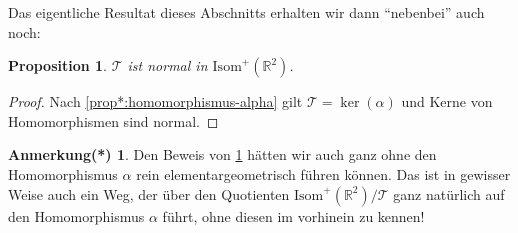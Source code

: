 \documentclass[a4paper, ngerman]{article}
\newcounter{chapter}
\numberwithin{equation}{chapter}
\theoremstyle{plain}
\newtheorem{proposition}{Proposition}[chapter]
\theoremstyle{definition}
\newtheorem{annotationstrd}{Anmerkung(*)}[chapter]
\newcommand{\geradisometr}{\ensuremath{\mathrm{Isom}^+(\mathbb R^2)}}
\newcommand{\anm}[1]{{\color{red} #1}}
\begin{document}
 

Das eigentliche Resultat dieses Abschnitts erhalten wir dann "`nebenbei"' auch noch: 
\begin{proposition}\label{prop:normale-translationen}
    \(\mathcal T\) ist normal in \(\geradisometr\). 
\end{proposition}
\begin{proof}
    Nach \cref{prop*:homomorphismus-alpha} gilt \(\mathcal T = \ker(\alpha)\) und Kerne von Homomorphismen sind normal. 
\end{proof}
\begin{annotationstrd}
    Den Beweis von \cref{prop:normale-translationen} hätten wir auch ganz ohne den Homomorphismus \(\alpha\) rein elementargeometrisch führen können. Das ist in gewisser Weise auch ein Weg, der über den Quotienten \(\geradisometr/\mathcal T\) ganz natürlich auf den Homomorphismus \(\alpha\) führt, ohne diesen im vorhinein zu kennen!
\end{annotationstrd}
\end{document}
